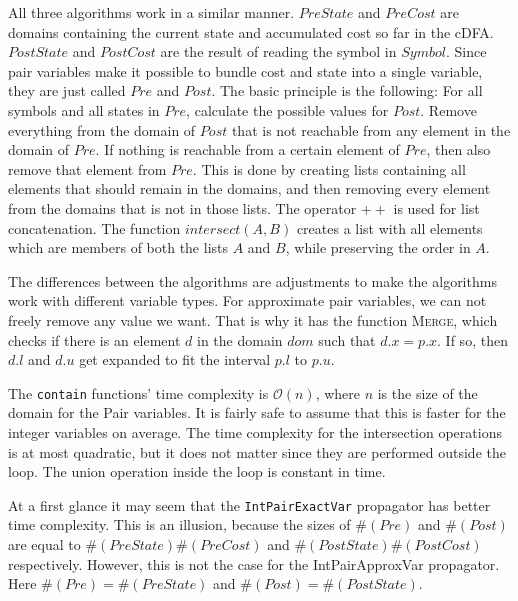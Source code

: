 \documentclass[a4paper,11pt]{article}
\begin{document}
All three algorithms work in a similar manner. $\mathit{PreState}$ and $\mathit{PreCost}$ are domains containing the current state and accumulated cost so far in the cDFA. $\mathit{PostState}$ and $\mathit{PostCost}$ are the result of reading the symbol in $\mathit{Symbol}$. Since pair variables make it possible to bundle cost and state into a single variable, they are just called $\mathit{Pre}$ and $\mathit{Post}$. The basic principle is the following: For all symbols and all states in $\mathit{Pre}$, calculate the possible values for $\mathit{Post}$. Remove everything from the domain of $\mathit{Post}$ that is not reachable from any element in the domain of $\mathit{Pre}$. If nothing is reachable from a certain element of $\mathit{Pre}$, then also remove that element from $\mathit{Pre}$. This is done by creating lists containing all elements that should remain in the domains, and then removing every element from the domains that is not in those lists. The operator $++$ is used for list concatenation. The function $\mathit{intersect}(A,B)$ creates a list with all elements which are members of both the lists $A$ and $B$, while preserving the order in $A$.



The differences between the algorithms are adjustments to make the algorithms work with different variable types. For approximate pair variables, we can not freely remove any value we want. That is why it has the function \textsc{Merge}, which checks if there is an element $d$ in the domain $\mathit{dom}$ such that $d.x=p.x$. If so, then $d.l$ and $d.u$ get expanded to fit the interval $p.l$ to $p.u$. 

The \texttt{contain} functions' time complexity is $\mathcal{O}(n)$, where $n$ is the size of the domain for the Pair variables. It is fairly safe to assume that this is faster for the integer variables on average. The time complexity for the intersection operations is at most quadratic, but it does not matter since they are performed outside the loop. The union operation inside the loop is constant in time.

At a first glance it may seem that the \texttt{IntPairExactVar} propagator has better time complexity. This is an illusion, because the sizes of $\#(\mathit{Pre})$ and $\#(\mathit{Post})$ are equal to \linebreak
$\#(\mathit{PreState}) 
\#(\mathit{PreCost})$ and 
$\#(\mathit{PostState})\#({PostCost})$ respectively. However, this is not the case for the IntPairApproxVar propagator. Here $\#(\mathit{Pre})=\#(\mathit{PreState})$ and $\#(\mathit{Post})=\#(\mathit{PostState})$. 
\end{document}
